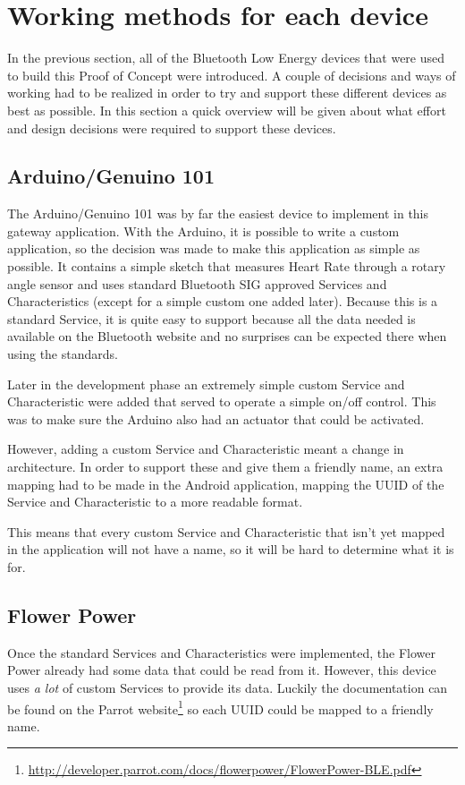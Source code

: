 \documentclass[pdftex,a4paper,12pt,twoside]{report}
\begin{document}
\section{Working methods for each device}
\label{sec:achievements}
In the previous section, all of the Bluetooth Low Energy devices that were used to build this Proof of Concept were introduced. A couple of decisions and ways of working had to be realized in order to try and support these different devices as best as possible. In this section a quick overview will be given about what effort and design decisions were required to support these devices.

\subsection{Arduino/Genuino 101}
\label{subsec:achievementsarduino101}
The Arduino/Genuino 101 was by far the easiest device to implement in this gateway application. With the Arduino, it is possible to write a custom application, so the decision was made to make this application as simple as possible. It contains a simple sketch that measures Heart Rate through a rotary angle sensor and uses standard Bluetooth SIG approved Services and Characteristics (except for a simple custom one added later). Because this is a standard Service, it is quite easy to support because all the data needed is available on the Bluetooth website and no surprises can be expected there when using the standards.

Later in the development phase an extremely simple custom Service and Characteristic were added that served to operate a simple on/off control. This was to make sure the Arduino also had an actuator that could be activated.

However, adding a custom Service and Characteristic meant a change in architecture. In order to support these and give them a friendly name, an extra mapping had to be made in the Android application, mapping the UUID of the Service and Characteristic to a more readable format.

This means that every custom Service and Characteristic that isn't yet mapped in the application will not have a name, so it will be hard to determine what it is for.

\subsection{Flower Power}
\label{subsec:achievementsflowerpower}
Once the standard Services and Characteristics were implemented, the Flower Power already had some data that could be read from it. However, this device uses \textit{a lot} of custom Services to provide its data. Luckily the documentation can be found on the Parrot website\footnote{\url{http://developer.parrot.com/docs/flowerpower/FlowerPower-BLE.pdf}} so each UUID could be mapped to a friendly name.
\end{document}
